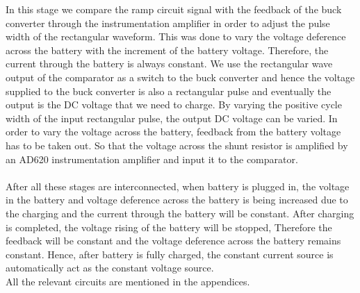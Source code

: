 \documentclass[a4paper,12pt]{article}
\newcounter{subsubsubsection}[subsubsection]
\begin{document}
\begin{multicols}{2}
In this stage we compare the ramp circuit signal with the feedback of the buck converter through the instrumentation amplifier in order to adjust the pulse width of the rectangular waveform. This was done to vary the voltage deference across the battery with the increment of the battery voltage. Therefore, the current through the battery is always constant.
We use the rectangular wave output of the comparator as a switch to the buck converter and hence the voltage supplied to the buck converter is also a rectangular pulse and eventually the output is the DC voltage that we need to charge. By varying the positive cycle width of the input rectangular pulse, the output DC voltage can be varied.
In order to vary the voltage across the battery, feedback from the battery voltage has to be taken out. So that the voltage across the shunt resistor is amplified by an AD620 instrumentation amplifier and input it to the comparator.\\\\
After all these stages are interconnected, when battery is plugged in, the voltage in the battery and voltage deference across the battery is being increased due to the charging and the current through the battery will be constant. After charging is completed, the voltage rising of the battery will be stopped, Therefore the feedback will be constant and the voltage deference across the battery remains constant. Hence, after battery is fully charged, the constant current source is automatically act as the constant voltage source.\\
All the relevant circuits are mentioned in the appendices.

\end{multicols}
\end{document}
